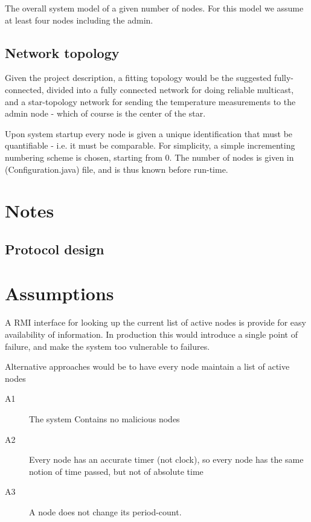 \documentclass[10pt,a4paper]{article}
\begin{document}
The overall system model of a given number of nodes. For this model we assume at least four nodes including the admin.

\subsection{Network topology}
Given the project description, a fitting topology would be the suggested fully-connected, divided into a fully connected network for doing reliable multicast, and a star-topology network for sending the temperature measurements to the admin node - which of course is the center of the star.

Upon system startup every node is given a unique identification that must be quantifiable - i.e. it must be comparable. For simplicity, a simple incrementing numbering scheme is chosen, starting from 0. The number of nodes is given in \File(Configuration.java) file, and is thus known before run-time.



\section{Notes}
\subsection{Protocol design}

\section{Assumptions}
A RMI interface for looking up the current list of active nodes is provide for easy availability of information. In production this would introduce a single point of failure, and make the system too vulnerable to failures.


Alternative approaches would be to have every node maintain a list of active nodes

\begin{description}
 \item[A1] The system Contains no malicious nodes
 \item[A2] Every node has an accurate timer (not clock), so every node has the same notion of time passed, but not of absolute time
 \item[A3] A node does not change its period-count.
\end{description} 
\end{document}
